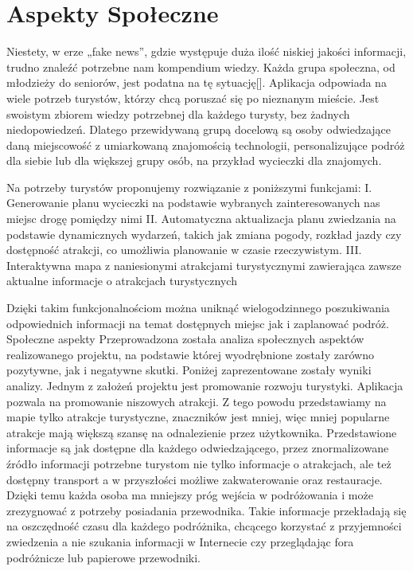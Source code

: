 

\section{Aspekty Społeczne}
\label{subsec:aspekty-spoleczne}



Niestety, w erze „fake news”, gdzie występuje duża ilość niskiej jakości informacji, trudno znaleźć potrzebne nam kompendium wiedzy. Każda grupa społeczna, od młodzieży do seniorów, jest podatna na tę sytuację[].
Aplikacja odpowiada na wiele potrzeb turystów, którzy chcą poruszać się po nieznanym mieście. Jest swoistym zbiorem wiedzy potrzebnej dla każdego turysty, bez żadnych niedopowiedzeń. Dlatego przewidywaną grupą docelową są osoby odwiedzające daną miejscowość z umiarkowaną znajomością technologii, personalizujące podróż dla siebie lub dla większej grupy osób, na przykład wycieczki dla znajomych.




   Na potrzeby turystów proponujemy rozwiązanie z poniższymi funkcjami:
I.	Generowanie planu wycieczki na podstawie wybranych zainteresowanych nas miejsc drogę pomiędzy nimi
II.	Automatyczna aktualizacja planu zwiedzania na podstawie dynamicznych wydarzeń, takich jak zmiana pogody, rozkład jazdy czy dostępność atrakcji, co umożliwia planowanie w czasie rzeczywistym.
III.	Interaktywna mapa z naniesionymi atrakcjami turystycznymi zawierająca zawsze aktualne informacje o atrakcjach turystycznych

Dzięki takim funkcjonalnościom można uniknąć wielogodzinnego poszukiwania odpowiednich informacji na temat dostępnych miejsc jak i zaplanować podróż.
Społeczne aspekty
Przeprowadzona została analiza społecznych aspektów realizowanego projektu, na podstawie której wyodrębnione zostały zarówno pozytywne, jak i negatywne skutki. Poniżej zaprezentowane zostały wyniki analizy.
Jednym z założeń projektu jest promowanie rozwoju turystyki. Aplikacja pozwala na promowanie niszowych atrakcji.
Z tego powodu przedstawiamy na mapie tylko atrakcje turystyczne, znaczników jest mniej, więc mniej popularne atrakcje mają większą szansę na odnalezienie przez użytkownika.
Przedstawione informacje są jak dostępne dla każdego odwiedzającego, przez znormalizowane źródło informacji potrzebne turystom nie tylko informacje o atrakcjach, ale też dostępny transport a w przyszłości  możliwe zakwaterowanie oraz restauracje.
Dzięki temu każda osoba ma mniejszy próg wejścia w podróżowania i może zrezygnować z potrzeby posiadania przewodnika.
Takie informacje przekładają się na oszczędność czasu dla każdego podróżnika, chcącego korzystać z przyjemności zwiedzenia a nie szukania informacji w Internecie czy przeglądając fora podróżnicze lub papierowe przewodniki.


